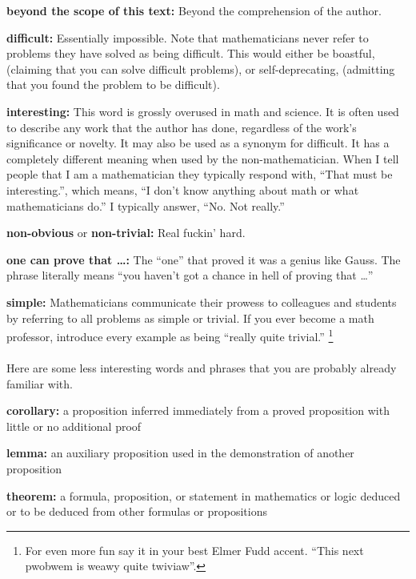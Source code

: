 \begin{description}
\item{\textbf{beyond the scope of this text:}}
  Beyond the comprehension of the author.
\item{\textbf{difficult:}}
  Essentially impossible.  Note that mathematicians never refer to problems 
  they have solved as being difficult.  This would either be boastful, 
  (claiming that you can solve difficult problems), or self-deprecating,
  (admitting that you found the problem to be difficult).
\item{\textbf{interesting:}}
  This word is grossly overused in math and science.
  It is often used to describe any work that the author has done, regardless 
  of the work's significance or novelty.
  It may also be used as a synonym for difficult.
  It has a completely different meaning when used by the non-mathematician.
  When I tell people that I am a mathematician they typically respond 
  with, ``That must be interesting.'', which means, ``I don't know 
  anything about math or what mathematicians do.''  I typically answer,
  ``No.  Not really.''  
\item{\textbf{non-obvious} or \textbf{non-trivial:}}
  Real fuckin' hard.
\item{\textbf{one can prove that \ldots:}}
  The ``one'' that proved it was a genius like Gauss.  The phrase literally 
  means ``you haven't got a chance in hell of proving that \ldots''
\item{\textbf{simple:}}
  Mathematicians communicate their prowess to colleagues and students by 
  referring to all problems as simple or trivial.  If you ever become a math
  professor, introduce every example as being ``really quite trivial.''
  \footnote{For even more fun say it in your best Elmer Fudd accent.
    ``This next pwobwem is weawy quite twiviaw''.}
\end{description}



\paragraph{}
Here are some less interesting words and phrases that you are 
probably already familiar with.

\begin{description}
\item{\textbf{corollary:}}
  a proposition inferred immediately from a proved proposition with little 
  or no additional proof
\item{\textbf{lemma:}}
  an auxiliary proposition used in the demonstration of another proposition
\item{\textbf{theorem:}}
  a formula, proposition, or statement in mathematics or logic deduced or 
  to be deduced from other formulas or propositions
\end{description}


